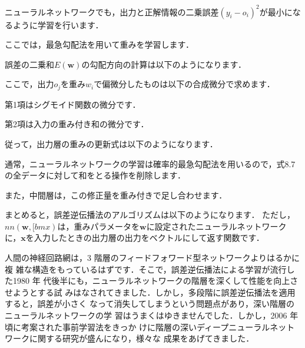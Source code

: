 

ニューラルネットワークでも，出力と正解情報の二乗誤差$(y_i - o_i)^2$が最小になるように学習を行います．


ここでは，最急勾配法を用いて重みを学習します．



誤差の二乗和$E(\bm{w})$の勾配方向の計算は以下のようになります．



ここで，出力$o_j$を重み$w_i$で偏微分したものは以下の合成微分で求めます．


第1項はシグモイド関数の微分です．


第2項は入力の重み付き和の微分です．


従って，出力層の重みの更新式は以下のようになります．


通常，ニューラルネットワークの学習は確率的最急勾配法を用いるので，式8.7の全データに対して和をとる操作を削除します．

また，中間層は，この修正量を重み付きで足し合わせます．


まとめると，誤差逆伝播法のアルゴリズムは以下のようになります．
ただし，$nn(\bm{w}, [bm{x})$は，重みパラメータを$\bm{w}$に設定されたニューラルネットワークに，$\bm{x}$を入力したときの出力層の出力をベクトルにして返す関数です．





人間の神経回路網は，3 階層のフィードフォワード型ネットワークよりはるかに複
雑な構造をもっているはずです．そこで，誤差逆伝播法による学習が流行した1980 年
代後半にも，ニューラルネットワークの階層を深くして性能を向上させようとする試
みはなされてきました．しかし，多段階に誤差逆伝播法を適用すると，誤差が小さく
なって消失してしまうという問題点があり，深い階層のニューラルネットワークの学
習はうまくはゆきませんでした．しかし，2006 年頃に考案された事前学習法をきっか
けに階層の深いディープニューラルネットワークに関する研究が盛んになり，様々な
成果をあげてきました．



